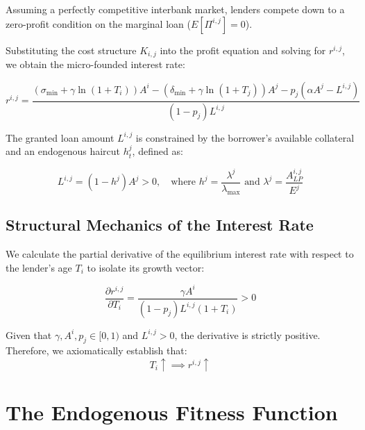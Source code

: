\documentclass{article}
\begin{document}
\noindent Assuming a perfectly competitive interbank market, lenders compete down to a zero-profit condition on the marginal loan ($E[\Pi^{i,j}] = 0$). 

\noindent Substituting the cost structure $K_{i,j}$ into the profit equation and solving for $r^{i,j}$, we obtain the micro-founded interest rate:

\begin{equation}
    r^{i,j} = \frac{\left( \sigma_{\min} + \gamma \ln(1 + T_i) \right) A^i - \left( \delta_{\min} + \gamma \ln(1 + T_j) \right) A^j - p_j(\alpha A^j - L^{i,j})}{(1 - p_j) L^{i,j}}
\end{equation}

\noindent The granted loan amount $L^{i,j}$ is constrained by the borrower's available collateral and an endogenous haircut $h^j_t$, defined as:

\begin{equation}
    L^{i,j} = (1 - h^j)A^j > 0, \quad \text{where } h^j = \frac{\lambda^j}{\lambda_{\max}} \text{ and } \lambda^j = \frac{A_{LP}^{i,j}}{E^j}
\end{equation}

\subsection{Structural Mechanics of the Interest Rate}

\noindent We calculate the partial derivative of the equilibrium interest rate with respect to the lender's age $T_i$ to isolate its growth vector:

\begin{equation}
    \frac{\partial r^{i,j}}{\partial T_i} = \frac{\gamma A^i}{(1 - p_j) L^{i,j} (1 + T_i)} > 0
\end{equation}

\noindent Given that $\gamma, A^i, p_j \in [0,1)$ and $L^{i,j} > 0$, the derivative is strictly positive. Therefore, we axiomatically establish that:
\begin{equation}
    T_i \uparrow \implies r^{i,j} \uparrow
\end{equation}

\section{The Endogenous Fitness Function}
\end{document}
